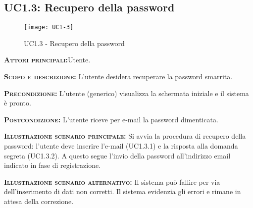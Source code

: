 \subsection{UC1.3: Recupero della password}
\begin{figure}[H]
\begin{center}
\texttt{[image: UC1-3]}
\caption{UC1.3 - Recupero della password}\label{fig:recupero}
\end{center}
\end{figure}
\begin{description}
\item{\scshape\bfseries Attori principali:}Utente.
\item{\scshape\bfseries Scopo e descrizione:} L'utente desidera recuperare la password smarrita.
\item{\scshape\bfseries Precondizione:} L'utente (generico) visualizza la schermata iniziale e il sistema è pronto.
\item{\scshape\bfseries Postcondizione:} L'utente riceve per e-mail la password dimenticata.
\item{\scshape\bfseries Illustrazione scenario principale:} Si avvia la procedura di recupero della password: l'utente deve inserire l'e-mail (UC1.3.1) e la risposta alla domanda segreta (UC1.3.2). A questo segue l'invio della password all'indirizzo email indicato in fase di registrazione.
\item{\scshape\bfseries Illustrazione scenario alternativo:} Il sistema può fallire per via dell'inserimento di dati non corretti. Il sistema evidenzia gli errori e rimane in attesa della correzione.
\end{description}

